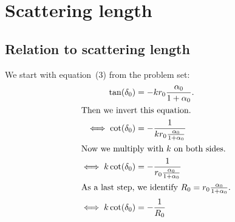 \documentclass[11pt, english, fleqn, DIV=15, headinclude, BCOR=1.5cm]{scrartcl}
\begin{document}
\section{Scattering length}

\subsection{Relation to scattering length}

We start with equation~(3) from the problem set:
\begin{align*}
    \tan(\delta_0) &= - k r_0 \frac{\alpha_0}{1 + \alpha_0}. \\
    \intertext{%
        Then we invert this equation.
    }
    \iff \cot(\delta_0) &= - \frac{1}{k r_0 \frac{\alpha_0}{1 + \alpha_0}} \\
    \intertext{%
        Now we multiply with $k$ on both sides.
    }
    \iff k \cot(\delta_0) &= - \frac{1}{r_0 \frac{\alpha_0}{1 + \alpha_0}} \\
    \intertext{%
        As a last step, we identify $R_0 = r_0 \frac{\alpha_0}{1 + \alpha_0}$.
    }
    \iff k \cot(\delta_0) &= - \frac{1}{R_0}
\end{align*}
\end{document}
